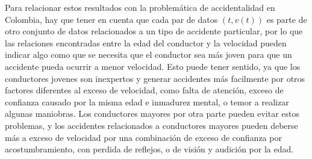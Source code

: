 Para relacionar estos resultados con la problemática de accidentalidad en Colombia, hay que tener en cuenta que cada par de datos $(t, v(t))$ es parte de otro conjunto de datos relacionados a un tipo de accidente particular, por lo que las relaciones encontradas entre la edad del conductor y la velocidad pueden indicar algo como que se necesita que el conductor sea más joven para que un accidente pueda ocurrir a menor velocidad. Esto puede tener sentido, ya que los conductores jovenes son inexpertos y generar accidentes más facilmente por otros factores diferentes al exceso de velocidad, como falta de atención, exceso de confianza causado por la misma edad e inmadurez mental, o temor a realizar algunas maniobras. Los conductores mayores por otra parte pueden evitar estos problemas, y los accidentes relacionados a conductores mayores pueden deberse más a exceso de velocidad por una combinación de exceso de confianza por acostumbramiento, con perdida de reflejos, o de visión y audición por la edad.